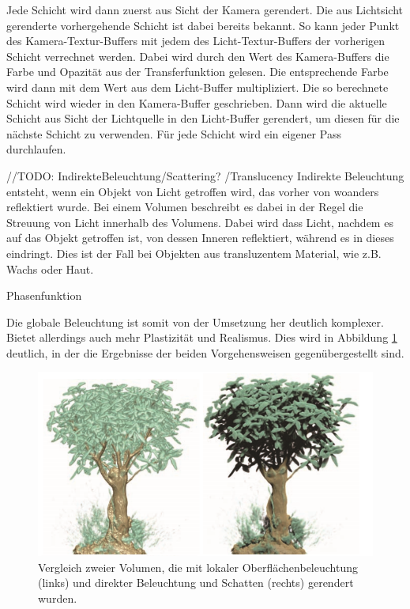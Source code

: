 Jede Schicht wird dann zuerst aus Sicht der Kamera gerendert. Die aus Lichtsicht gerenderte vorhergehende Schicht ist dabei bereits bekannt. So kann jeder Punkt des Kamera-Textur-Buffers mit jedem des Licht-Textur-Buffers der vorherigen Schicht verrechnet werden. Dabei wird durch den Wert des Kamera-Buffers die Farbe und Opazität aus der Transferfunktion gelesen. Die entsprechende Farbe wird dann mit dem Wert aus dem Licht-Buffer multipliziert. Die so berechnete Schicht wird wieder in den Kamera-Buffer geschrieben. Dann wird die aktuelle Schicht aus Sicht der Lichtquelle in den Licht-Buffer gerendert, um diesen für die nächste Schicht zu verwenden.
Für jede Schicht wird ein eigener Pass durchlaufen.
\cite{Hadwiger06}
\cite{Fernando04}

//TODO:
IndirekteBeleuchtung/Scattering? /Translucency  
Indirekte Beleuchtung entsteht, wenn ein Objekt von Licht getroffen wird, das vorher von woanders reflektiert wurde. Bei einem Volumen beschreibt es dabei in der Regel die Streuung von Licht innerhalb des Volumens. Dabei wird dass Licht, nachdem es auf das Objekt getroffen ist, von dessen Inneren reflektiert, während es in dieses eindringt. Dies ist der Fall bei Objekten aus transluzentem Material, wie z.B. Wachs oder Haut.

Phasenfunktion 

Die globale Beleuchtung ist somit von der Umsetzung her deutlich komplexer. Bietet allerdings auch mehr Plastizität und Realismus. Dies wird in Abbildung \ref{img:localGlobalIll} deutlich, in der die Ergebnisse der beiden Vorgehensweisen gegenübergestellt sind.

\begin{figure}
	\centering
	\includegraphics[width=0.7\linewidth]{images/localGlobalIllumination.png}
	\caption{Vergleich zweier Volumen, die mit lokaler Oberflächenbeleuchtung (links) und direkter Beleuchtung und Schatten (rechts) gerendert wurden. \cite{Hadwiger06}}
	\label{img:localGlobalIll}
\end{figure}

